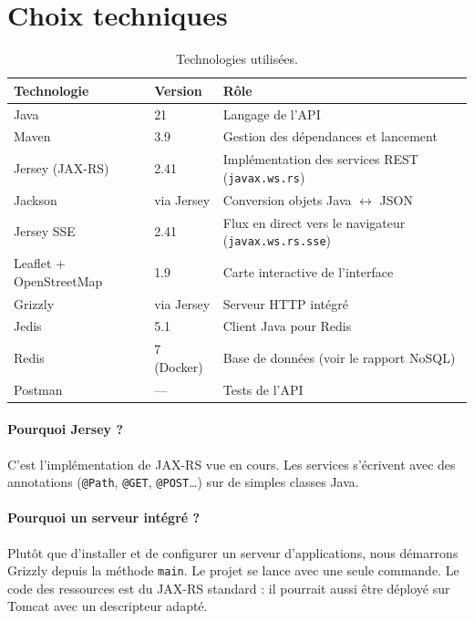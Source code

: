 \documentclass[11pt,a4paper]{article}
\begin{document}
\section{Choix techniques}

\begin{table}[htbp]\centering
\begin{tabularx}{\textwidth}{@{}L{3.6cm}L{3.2cm}X@{}}
\toprule
\textbf{Technologie} & \textbf{Version} & \textbf{R\^ole}\\
\midrule
Java & 21 & Langage de l'API\\
Maven & 3.9 & Gestion des d\'ependances et lancement\\
Jersey (JAX-RS) & 2.41 & Impl\'ementation des services REST (\texttt{javax.ws.rs})\\
Jackson & via Jersey & Conversion objets Java $\leftrightarrow$ JSON\\
Jersey SSE & 2.41 & Flux en direct vers le navigateur (\texttt{javax.ws.rs.sse})\\
Leaflet + OpenStreetMap & 1.9 & Carte interactive de l'interface\\
Grizzly & via Jersey & Serveur HTTP int\'egr\'e\\
Jedis & 5.1 & Client Java pour Redis\\
Redis & 7 (Docker) & Base de donn\'ees (voir le rapport NoSQL)\\
Postman & --- & Tests de l'API\\
\bottomrule
\end{tabularx}
\caption{Technologies utilis\'ees.}
\end{table}

\paragraph{Pourquoi Jersey ?}
C'est l'impl\'ementation de JAX-RS vue en cours. Les services s'\'ecrivent avec des annotations (\texttt{@Path}, \texttt{@GET}, \texttt{@POST}\ldots) sur de simples classes Java.

\paragraph{Pourquoi un serveur int\'egr\'e ?}
Plut\^ot que d'installer et de configurer un serveur d'applications, nous d\'emarrons Grizzly depuis la m\'ethode \texttt{main}. Le projet se lance avec une seule commande. Le code des ressources est du JAX-RS standard : il pourrait aussi \^etre d\'eploy\'e sur Tomcat avec un descripteur adapt\'e.
\end{document}
